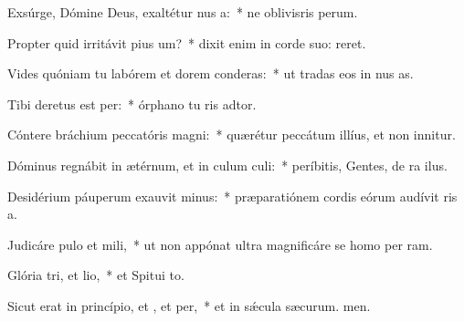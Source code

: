 \item Exsúrge, Dómine Deus, exaltétur nus a:~* ne oblivisris perum.
\item Propter quid irritávit pius um?~* dixit enim in corde suo:  reret.
\item Vides quóniam tu labórem et dorem conderas:~* ut tradas eos in nus as.
\item Tibi deretus est per:~* órphano tu ris adtor.
\item Cóntere bráchium peccatóris  magni:~* quærétur peccátum illíus, et non innitur.
\item Dóminus regnábit in ætérnum, et in culum culi:~* períbitis, Gentes, de ra ilus.
\item Desidérium páuperum exauvit minus:~* præparatiónem cordis eórum audívit ris a.
\item Judicáre pulo et mili,~* ut non appónat ultra magnificáre se homo per ram.
\item Glória tri, et lio,~* et Spitui to.
\item Sicut erat in princípio, et , et per,~* et in sǽcula sæcurum. men.
